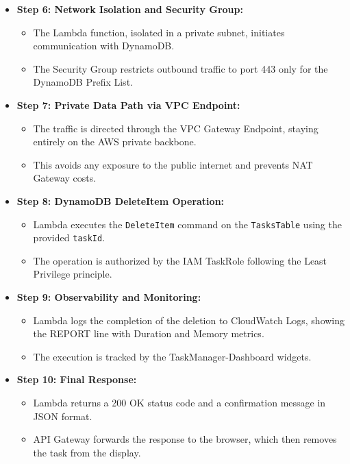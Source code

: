 \begin{itemize}
\begin{itemize}
  \end{itemize}
  \item \textbf{Step 6: Network Isolation and Security Group:}
  \begin{itemize}
    \item The Lambda function, isolated in a private subnet, initiates communication with DynamoDB.
    \item The Security Group restricts outbound traffic to port 443 only for the DynamoDB Prefix List.
  \end{itemize}
  \item \textbf{Step 7: Private Data Path via VPC Endpoint:}
  \begin{itemize}
    \item The traffic is directed through the VPC Gateway Endpoint, staying entirely on the AWS private backbone.
    \item This avoids any exposure to the public internet and prevents NAT Gateway costs.
  \end{itemize}
  \item \textbf{Step 8: DynamoDB DeleteItem Operation:}
  \begin{itemize}
    \item Lambda executes the \texttt{DeleteItem} command on the \texttt{TasksTable} using the provided \texttt{taskId}.
    \item The operation is authorized by the IAM TaskRole following the Least Privilege principle.
  \end{itemize}
  \item \textbf{Step 9: Observability and Monitoring:}
  \begin{itemize}
    \item Lambda logs the completion of the deletion to CloudWatch Logs, showing the REPORT line with Duration and Memory metrics.
    \item The execution is tracked by the TaskManager-Dashboard widgets.
  \end{itemize}
  \item \textbf{Step 10: Final Response:}
  \begin{itemize}
    \item Lambda returns a 200 OK status code and a confirmation message in JSON format.
    \item API Gateway forwards the response to the browser, which then removes the task from the display.
  \end{itemize}
\end{itemize}

